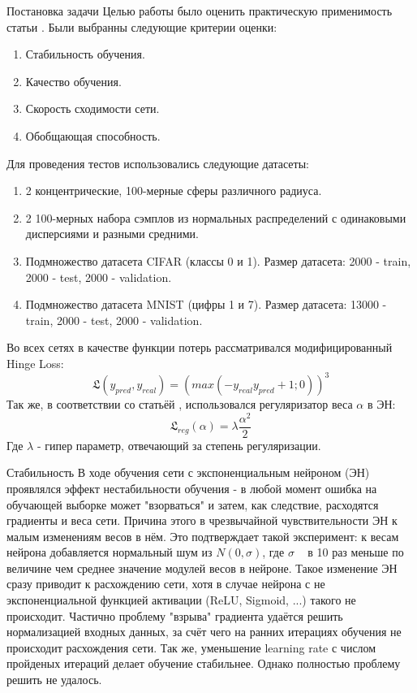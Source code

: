 \documentclass[a4paper,12pt,titlepage,finall]{article}
\begin{document}
	
\begin{section}{Постановка задачи}	
	Целью работы было оценить практическую применимость статьи \cite{AddingOne}. Были выбранны следующие критерии оценки:
\begin{enumerate}
	\item Стабильность обучения.
	\item Качество обучения.
	\item Скорость сходимости сети.
	\item Обобщающая способность.
\end{enumerate}

	Для проведения тестов использовались следующие датасеты:
\begin{enumerate}
	\item 2 концентрические, 100-мерные сферы различного радиуса.
	\item 2 100-мерных набора сэмплов из нормальных распределений с одинаковыми дисперсиями и разными средними.
	\item Подмножество датасета CIFAR (классы 0 и 1). Размер датасета: 2000 - train, 2000 - test, 2000 - validation.
	\item Подмножество датасета MNIST (цифры 1 и 7). Размер датасета: 13000 - train, 2000 - test, 2000 - validation.
\end{enumerate}

	Во всех сетях в качестве функции потерь рассматривался модифицированный Hinge Loss:
\begin{equation}
	\mathfrak{L}(y_{pred}, y_{real}) = (max(-y_{real}y_{pred} + 1; 0))^{3}
\end{equation}
	Так же, в соответствии со статьёй \cite{AddingOne}, использовался регуляризатор веса $\alpha$ в ЭН:
	\begin{equation}
	\mathfrak{L}_{reg}(\alpha) = \lambda \frac{\alpha^{2}}{2}
	\end{equation}
	Где $\lambda$ - гипер параметр, отвечающий за степень регуляризации.

\end{section}

\begin{section}{Стабильность}
	В ходе обучения сети с экспоненциальным нейроном (ЭН) проявлялся эффект нестабильности обучения - в любой момент ошибка на обучающей выборке может "взорваться" и затем, как следствие, расходятся градиенты и веса сети. Причина этого в чрезвычайной чувствительности ЭН к малым изменениям весов в нём. Это подтверждает такой эксперимент: к весам нейрона добавляется нормальный шум из $N(0, \sigma)$, где $\sigma$ ~ в 10 раз меньше по величине чем среднее значение модулей весов в нейроне. Такое изменение ЭН сразу приводит к расхождению сети, хотя в случае нейрона с не экспоненциальной функцией активации (ReLU, Sigmoid, ...) такого не происходит. Частично проблему "взрыва" градиента удаётся решить нормализацией входных данных, за счёт чего на ранних итерациях обучения не происходит расхождения сети. Так же, уменьшение learning rate с числом пройденых итераций делает обучение стабильнее. Однако полностью проблему решить не удалось.
\end{section}
\end{document}

